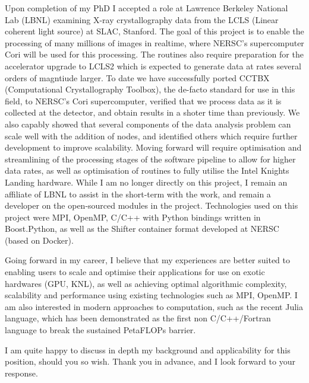 \documentclass[11pt,a4paper,unicode]{moderncv}
\begin{document}
{Upon completion of my PhD I accepted a role at Lawrence Berkeley National Lab (LBNL) examining X-ray crystallography data from the LCLS (Linear coherent light source) at SLAC, Stanford. The goal of this project is to enable the processing of many millions of images in realtime, where NERSC’s supercomputer Cori will be used for this processing. The routines also require preparation for the accelerator upgrade to LCLS2 which is expected to generate data at rates several orders of magntiude larger. To date we have successfully ported CCTBX (Computational Crystallography Toolbox), the de-facto standard for use in this field, to NERSC's Cori supercomputer, verified that we process data as it is collected at the detector, and obtain results in a shoter time than previously. We also capably showed that several components of the data analysis problem can scale well with the addition of nodes, and identified others which require further development to improve scalability. Moving forward will require optimisation and streamlining of the processing stages of the software pipeline to allow for higher data rates, as well as optimisation of routines to fully utilise the Intel Knights Landing hardware. While I am no longer directly on this project, I remain an affiliate of LBNL to assist in the short-term with the work, and remain a developer on the open-sourced modules in the project. Technologies used on this project were MPI, OpenMP, C/C++ with Python bindings written in Boost.Python, as well as the Shifter container format developed at NERSC (based on Docker).

Going forward in my career, I believe that my experiences are better suited to enabling users to scale and optimise their applications for use on exotic hardwares (GPU, KNL), as well as achieving optimal algorithmic complexity, scalability and performance using existing technologies such as MPI, OpenMP. I am also interested in modern approaches to computation, such as the recent Julia language, which has been demonstrated as the first non C/C++/Fortran language to break the sustained PetaFLOPs barrier.

I am quite happy to discuss in depth my background and applicability for this position, should you so wish. Thank you in advance, and I look forward to your response.

}
%
\makeletterclosing %
\fi
\end{document}
